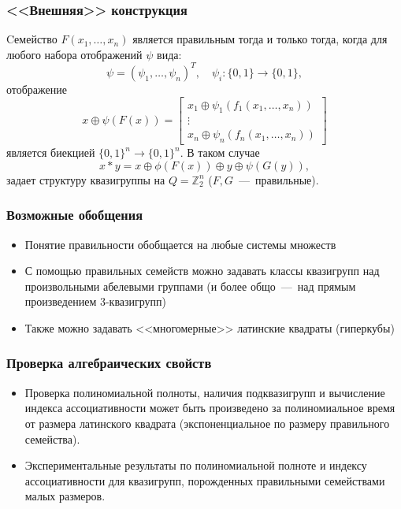 \begin{frame}
    \frametitle{<<Внешняя>> конструкция}
    \begin{thm}
        Cемейство $F(x_1, \ldots, x_n)$ является правильным тогда и только тогда, когда для любого набора отображений $\psi$ вида: 
        \[
            \psi = (\psi_1, \ldots, \psi_n)^T,
            \quad
            \psi_i : \{0, 1\} \to \{0, 1\},
        \]
        отображение
        \[ 
            x \oplus \psi(F(x)) = 
            \begin{bmatrix}
                x_1 \oplus \psi_1(f_1(x_1, \ldots, x_n))\\
                \vdots \\
                x_n \oplus \psi_n(f_n(x_1, \ldots, x_n))
            \end{bmatrix}
        \]
        является биекцией $\{0, 1\}^n \to \{0, 1\}^n.$
        \pause
        В таком случае 
        \[
            x \ast y = x \oplus \phi(F(x)) \oplus y \oplus \psi(G(y)),
        \]
        задает структуру квазигруппы на $Q = \mathbb{Z}_2^n$ ($F, G$~---~правильные).
    \end{thm}
\end{frame}


\begin{frame}
    \frametitle{Возможные обобщения}
    \begin{itemize}
        \item Понятие правильности обобщается на любые системы множеств
        \pause
        \item С помощью правильных семейств можно задавать классы квазигрупп над произвольными абелевыми группами (и более общо~---~над прямым произведением 3-квазигрупп)
        \pause
        \item Также можно задавать <<многомерные>> латинские квадраты (гиперкубы)
    \end{itemize}
\end{frame}


\begin{frame}
    \frametitle{Проверка алгебраических свойств}
    \begin{itemize}
        \item Проверка полиномиальной полноты, наличия подквазигрупп и вычисление индекса ассоциативности может быть произведено за полиномиальное время от размера латинского квадрата (экспоненциальное по размеру правильного семейства).
        \pause
        \item Экспериментальные результаты по полиномиальной полноте и индексу ассоциативности для квазигрупп, порожденных правильными семействами малых размеров.
    \end{itemize}
\end{frame}





